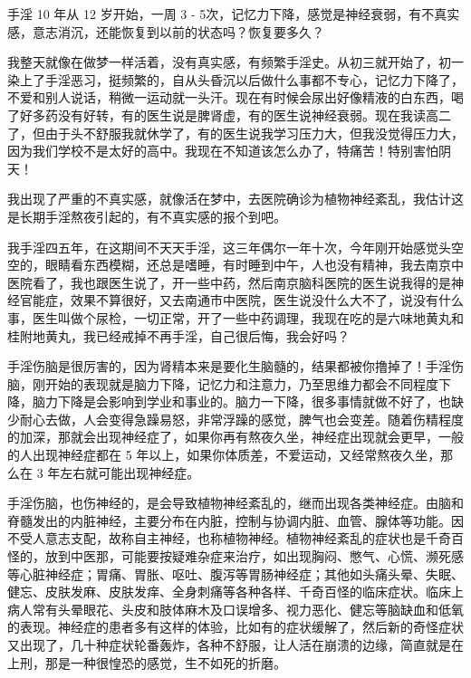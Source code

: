 \begin{case}[不真实感]
    手淫 10 年从 12 岁开始，一周 3 - 5次，记忆力下降，感觉是神经衰弱，有不真实感，意志消沉，还能恢复到以前的状态吗？恢复要多久？
\end{case}

\begin{case}[不真实感]
    我整天就像在做梦一样活着，没有真实感，有频繁手淫史。从初三就开始了，初一染上了手淫恶习，挺频繁的，自从头昏沉以后做什么事都不专心，记忆力下降了，不爱和别人说话，稍微一运动就一头汗。现在有时候会尿出好像精液的白东西，喝了好多药没有好转，有的医生说是脾肾虚，有的医生说神经衰弱。现在我读高二了，但由于头不舒服我就休学了，有的医生说我学习压力大，但我没觉得压力大，因为我们学校不是太好的高中。我现在不知道该怎么办了，特痛苦！特别害怕阴天！
\end{case}

\begin{case}[不真实感]
    我出现了严重的不真实感，就像活在梦中，去医院确诊为植物神经紊乱，我估计这是长期手淫熬夜引起的，有不真实感的报个到吧。
\end{case}

\begin{case}[不真实感]
    我手淫四五年，在这期间不天天手淫，这三年偶尔一年十次，今年刚开始感觉头空空的，眼睛看东西模糊，还总是嗜睡，有时睡到中午，人也没有精神，我去南京中医院看了，我也跟医生说了，开一些中药，然后南京脑科医院的医生说我得的是神经官能症，效果不算很好，又去南通市中医院，医生说没什么大不了，说没有什么事，医生叫做个尿检，一切正常，开了一些中药调理，我现在吃的是六味地黄丸和桂附地黄丸，我已经戒掉不再手淫，自己很后悔，我会好吗？
\end{case}

手淫伤脑是很厉害的，因为肾精本来是要化生脑髓的，结果都被你撸掉了！手淫伤脑，刚开始的表现就是脑力下降，记忆力和注意力，乃至思维力都会不同程度下降，脑力下降是会影响到学业和事业的。脑力一下降，很多事情就做不好了，也缺少耐心去做，人会变得急躁易怒，非常浮躁的感觉，脾气也会变差。随着伤精程度的加深，那就会出现神经症了，如果你再有熬夜久坐，神经症出现就会更早，一般的人出现神经症都在 5 年以上，如果你体质差，不爱运动，又经常熬夜久坐，那么在 3 年左右就可能出现神经症。

手淫伤脑，也伤神经的，是会导致植物神经紊乱的，继而出现各类神经症。由脑和脊髓发出的内脏神经，主要分布在内脏，控制与协调内脏、血管、腺体等功能。因不受人意志支配，故称自主神经，也称植物神经。植物神经紊乱的症状也是千奇百怪的，放到中医那，可能要按疑难杂症来治疗，如出现胸闷、憋气、心慌、濒死感等心脏神经症；胃痛、胃胀、呕吐、腹泻等胃肠神经症；其他如头痛头晕、失眠、健忘、皮肤发麻、皮肤发痒、全身刺痛等各种各样、千奇百怪的临床症状。临床上病人常有头晕眼花、头皮和肢体麻木及口误增多、视力恶化、健忘等脑缺血和低氧的表现。神经症的患者多有这样的体验，比如有的症状缓解了，然后新的奇怪症状又出现了，几十种症状轮番轰炸，各种不舒服，让人活在崩溃的边缘，简直就是在上刑，那是一种很惶恐的感觉，生不如死的折磨。

